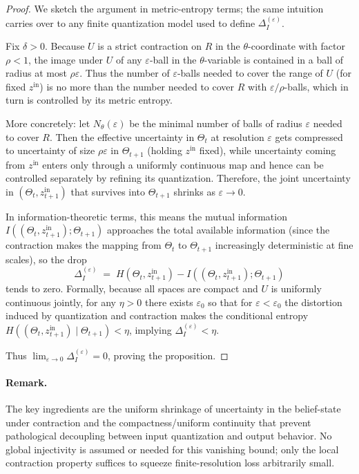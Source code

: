 \documentclass[12pt]{article}
\theoremstyle{definition}
\theoremstyle{plain}
\begin{document}
\begin{proof}
We sketch the argument in metric-entropy terms; the same intuition carries over to any finite quantization model used to define \(\Delta_I^{(\varepsilon)}\).

Fix \(\delta>0\). Because \(U\) is a strict contraction on \(R\) in the \(\theta\)-coordinate with factor \(\rho<1\), the image under \(U\) of any \(\varepsilon\)-ball in the \(\theta\)-variable is contained in a ball of radius at most \(\rho\varepsilon\). Thus the number of \(\varepsilon\)-balls needed to cover the range of \(U\) (for fixed \(z^{\mathrm{in}}\)) is no more than the number needed to cover \(R\) with \(\varepsilon/\rho\)-balls, which in turn is controlled by its metric entropy.

More concretely: let \(N_{\theta}(\varepsilon)\) be the minimal number of balls of radius \(\varepsilon\) needed to cover \(R\). Then the effective uncertainty in \(\Theta_t\) at resolution \(\varepsilon\) gets compressed to uncertainty of size \(\rho\varepsilon\) in \(\Theta_{t+1}\) (holding \(z^{\mathrm{in}}\) fixed), while uncertainty coming from \(z^{\mathrm{in}}\) enters only through a uniformly continuous map and hence can be controlled separately by refining its quantization. Therefore, the joint uncertainty in \((\Theta_t,z^{\mathrm{in}}_{t+1})\) that survives into \(\Theta_{t+1}\) shrinks as \(\varepsilon\to 0\).

In information-theoretic terms, this means the mutual information \(I((\Theta_t,z^{\mathrm{in}}_{t+1}); \Theta_{t+1})\) approaches the total available information (since the contraction makes the mapping from \(\Theta_t\) to \(\Theta_{t+1}\) increasingly deterministic at fine scales), so the drop
\[
\Delta_I^{(\varepsilon)} \;=\; H(\Theta_t,z^{\mathrm{in}}_{t+1}) - I((\Theta_t,z^{\mathrm{in}}_{t+1}); \Theta_{t+1})
\]
tends to zero. Formally, because all spaces are compact and \(U\) is uniformly continuous jointly, for any \(\eta>0\) there exists \(\varepsilon_0\) so that for \(\varepsilon<\varepsilon_0\) the distortion induced by quantization and contraction makes the conditional entropy \(H((\Theta_t,z^{\mathrm{in}}_{t+1}) \mid \Theta_{t+1}) < \eta\), implying \(\Delta_I^{(\varepsilon)}<\eta\).

Thus \(\lim_{\varepsilon\to 0} \Delta_I^{(\varepsilon)}=0\), proving the proposition.
\end{proof}

\paragraph{Remark.} The key ingredients are the uniform shrinkage of uncertainty in the belief-state under contraction and the compactness/uniform continuity that prevent pathological decoupling between input quantization and output behavior.  No global injectivity is assumed or needed for this vanishing bound; only the local contraction property suffices to squeeze finite-resolution loss arbitrarily small.
\end{document}
